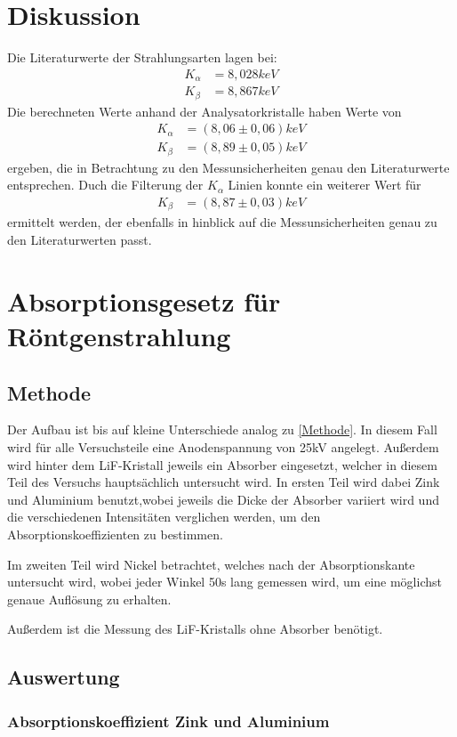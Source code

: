 \documentclass[
	a4paper,
	12pt,
	pagesize,
	ngerman
]{scrartcl}
\begin{document}
\section{Diskussion}
Die Literaturwerte der Strahlungsarten lagen bei:
\begin{align*}
    K_{\alpha} &= 8,028 keV \\
    K_{\beta} &= 8,867 keV
\end{align*}
Die berechneten Werte anhand der Analysatorkristalle haben Werte von
\begin{align*}
    K_{\alpha} &= (8,06 \pm 0,06) keV \\
    K_{\beta} &= (8,89 \pm 0,05) keV
\end{align*}
ergeben, die in Betrachtung zu den Messunsicherheiten genau den Literaturwerte entsprechen. Duch die Filterung der $K_{\alpha}$ Linien konnte ein weiterer Wert für 
\begin{align*}
    K_{\beta} &= (8,87 \pm 0,03)keV
\end{align*}
ermittelt werden, der ebenfalls in hinblick auf die Messunsicherheiten genau zu den Literaturwerten passt.

\section{Absorptionsgesetz für Röntgenstrahlung}
\subsection{Methode}
Der Aufbau ist bis auf kleine Unterschiede analog zu \cref{Methode}. In diesem Fall wird für alle Versuchsteile eine Anodenspannung von 25kV angelegt. Außerdem wird hinter dem LiF-Kristall jeweils ein Absorber eingesetzt, welcher in diesem Teil des Versuchs hauptsächlich untersucht wird. In ersten Teil wird dabei Zink und Aluminium benutzt,wobei jeweils die Dicke der Absorber variiert wird und die verschiedenen Intensitäten verglichen werden, um den Absorptionskoeffizienten zu bestimmen. 

Im zweiten Teil wird Nickel betrachtet, welches nach der Absorptionskante untersucht wird, wobei jeder Winkel 50s lang gemessen wird, um eine möglichst genaue Auflösung zu erhalten.

Außerdem ist die Messung des LiF-Kristalls ohne Absorber benötigt.
\subsection{Auswertung}
\subsubsection{Absorptionskoeffizient Zink und Aluminium}
\end{document}
